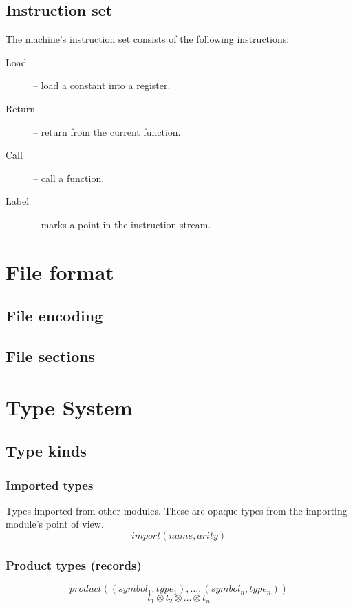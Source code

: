\documentclass[a4paper]{report}
\begin{document}
\section{Instruction set}

The machine's instruction set consists of the following instructions:

\begin{description}
\item[Load] -- load a constant into a register.
\item[Return] -- return from the current function.
\item[Call] -- call a function.
\item[Label] -- marks a point in the instruction stream.
\end{description}





\chapter{File format}

\section{File encoding}



\section{File sections}



\chapter{Type System}

\section{Type kinds}

\subsection{Imported types}
Types imported from other modules. These are opaque types from the
importing module's point of view.
$$ \mathit{import(name, arity)} $$

\subsection{Product types (records)}
$$ \mathit{product((symbol_1, type_1), \ldots, (symbol_n, type_n))} $$
$$ t_1 \otimes t_2 \otimes \ldots \otimes t_n $$
\end{document}
